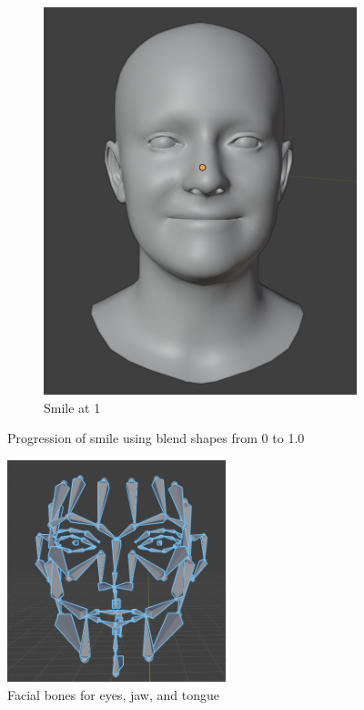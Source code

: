 \documentclass[../../main.tex]{subfiles}
\begin{document}
\begin{figure}[h]
\begin{subfigure}{0.3\linewidth}
      \includegraphics[width=\linewidth]{chapters/background_work/images/blendshapes_example/blendshapes_example_3.png} 
      \caption{Smile at 1} 
  \end{subfigure}
  \caption{Progression of smile using blend shapes from 0 to 1.0}
  \label{fig:blendshapes_smile}
\end{figure}

\begin{figure} 
  \centering \includegraphics[width = 2.5in]{chapters/background_work/images/facial_bones.png} 
  \caption{Facial bones for eyes, jaw, and tongue} 
  \label{fig:facial_bones} 
\end{figure}
\end{document}
